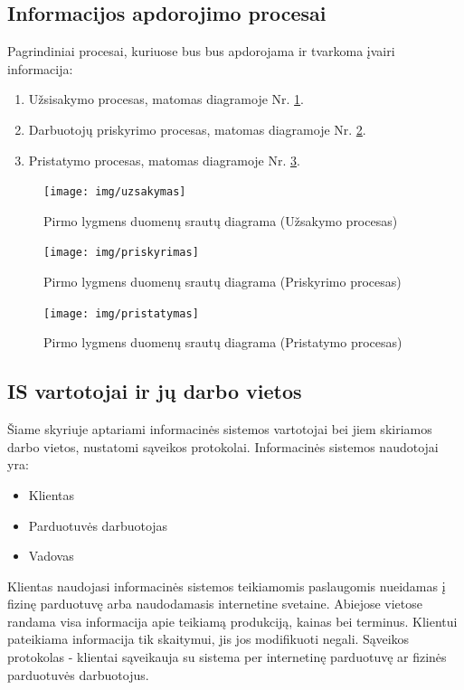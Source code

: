 \documentclass{VUMIFPSkursinis}
\begin{document}
\newpage
\subsection{Informacijos apdorojimo procesai}
Pagrindiniai procesai, kuriuose bus bus apdorojama ir tvarkoma įvairi informacija:
\begin{enumerate}
    \item Užsisakymo procesas, matomas diagramoje Nr. \ref{img:uzsakymas}. 
    \item Darbuotojų priskyrimo procesas, matomas diagramoje Nr. \ref{img:priskyrimas}.
    \item Pristatymo procesas, matomas diagramoje Nr. \ref{img:pristatymas}.
\end{enumerate}
\begin{figure}[H]
    \centering
    \texttt{[image: img/uzsakymas]}
    \caption{Pirmo lygmens duomenų srautų diagrama (Užsakymo procesas)}
    \label{img:uzsakymas}
\end{figure}

\begin{figure}[H]
    \centering
    \texttt{[image: img/priskyrimas]}
    \caption{Pirmo lygmens duomenų srautų diagrama (Priskyrimo procesas)}
    \label{img:priskyrimas}
\end{figure}

\begin{figure}[H]
    \centering
    \texttt{[image: img/pristatymas]}
    \caption{Pirmo lygmens duomenų srautų diagrama (Pristatymo procesas)}
    \label{img:pristatymas}
\end{figure}


\newpage
\subsection{IS vartotojai ir jų darbo vietos}
Šiame skyriuje aptariami informacinės sistemos vartotojai bei jiem skiriamos darbo vietos, nustatomi sąveikos protokolai. Informacinės sistemos naudotojai yra:
\begin{itemize}
    \item Klientas
    \item Parduotuvės darbuotojas
    \item Vadovas
\end{itemize}

Klientas naudojasi informacinės sistemos teikiamomis paslaugomis nueidamas į fizinę parduotuvę arba naudodamasis internetine svetaine. Abiejose vietose randama visa informacija apie teikiamą produkciją, kainas bei terminus. Klientui pateikiama informacija tik skaitymui, jis jos modifikuoti negali. Sąveikos protokolas - klientai sąveikauja su sistema per internetinę parduotuvę ar fizinės parduotuvės darbuotojus.
\end{document}
